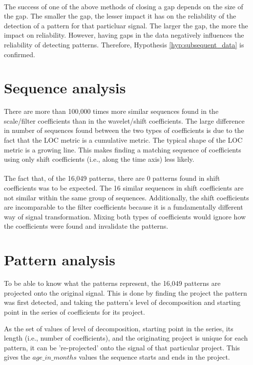 \paragraph{}
The success of one of the above methods of closing a gap depends on the size of
the gap. The smaller the gap, the lesser impact it has on the reliability of
the detection of a pattern for that particluar signal. The larger the gap, the
more the impact on reliability. However, having gaps in the data negatively
influences the reliability of detecting patterns. Therefore, Hypothesis
\ref{hyp:subsequent_data} is confirmed.

\section{Sequence analysis}
There are more than 100,000 times more similar sequences found in the
scale/filter coefficients than in the wavelet/shift coefficients. The large
difference in number of sequences found between the two types of coefficients
is due to the fact that the LOC metric is a cumulative metric. The typical shape
of the LOC metric is a growing line. This makes finding a matching sequence of
coefficients using only shift coefficients (i.e., along the time axis) less
likely.

\paragraph{}
The fact that, of the 16,049 patterns, there are 0 patterns found in shift
coefficients was to be expected. The 16 similar sequences in shift coefficients
are not similar within the same group of sequences. Additionally, the shift
coefficients are incomparable to the filter coefficients because it is a
fundamentally different way of signal transformation. Mixing both types of
coefficients would ignore how the coefficients were found and invalidate the
patterns.

\section{Pattern analysis}
\label{section:pattern_evaluation}
To be able to know what the patterns represent, the 16,049 patterns are
projected onto the original signal. This is done by finding the project the
pattern was first detected, and taking the pattern's level of decomposition and
starting point in the series of coefficients for its project.

As the set of values of level of decomposition, starting point in the series,
its length (i.e., number of coefficients), and the originating project is
unique for each pattern, it can be 're-projected' onto the signal of that
particular project. This gives the $age\_in\_months$ values the sequence starts
and ends in the project.

